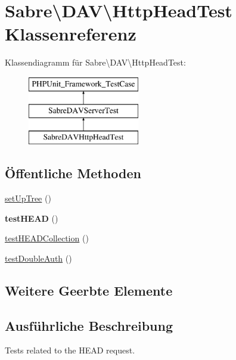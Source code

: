 \hypertarget{class_sabre_1_1_d_a_v_1_1_http_head_test}{}\section{Sabre\textbackslash{}D\+AV\textbackslash{}Http\+Head\+Test Klassenreferenz}
\label{class_sabre_1_1_d_a_v_1_1_http_head_test}
Klassendiagramm für Sabre\textbackslash{}D\+AV\textbackslash{}Http\+Head\+Test\+:\begin{figure}[H]
\begin{center}
\leavevmode
\includegraphics[height=3.000000cm]{class_sabre_1_1_d_a_v_1_1_http_head_test}
\end{center}
\end{figure}
\subsection*{Öffentliche Methoden}
\begin{DoxyCompactItemize}
\item 
\mbox{\hyperlink{class_sabre_1_1_d_a_v_1_1_http_head_test_a537740a7921e43651c448975d377b9d6}{set\+Up\+Tree}} ()
\item 
\mbox{\label{class_sabre_1_1_d_a_v_1_1_http_head_test_a710b4169a79d4c4b4cb4a71d6767f8bf}} 
{\bfseries test\+H\+E\+AD} ()
\item 
\mbox{\hyperlink{class_sabre_1_1_d_a_v_1_1_http_head_test_a28bbb6fa800b397a13499c2de3f3bab0}{test\+H\+E\+A\+D\+Collection}} ()
\item 
\mbox{\hyperlink{class_sabre_1_1_d_a_v_1_1_http_head_test_a4fe590e6508f28f58ac55e599e4f4468}{test\+Double\+Auth}} ()
\end{DoxyCompactItemize}
\subsection*{Weitere Geerbte Elemente}


\subsection{Ausführliche Beschreibung}
Tests related to the H\+E\+AD request.

